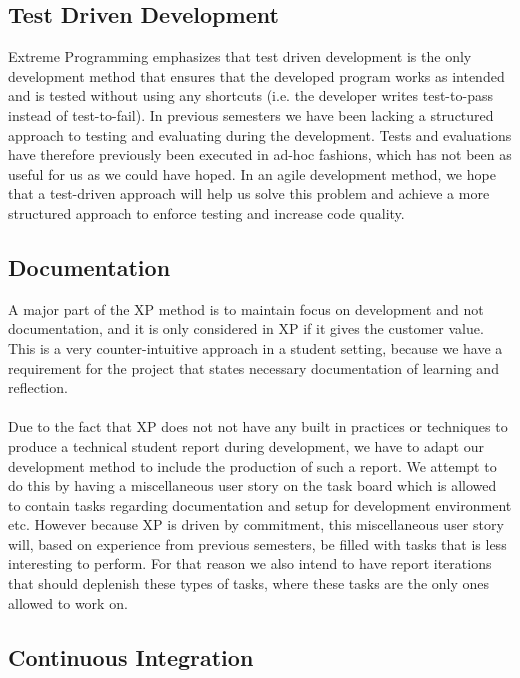 \subsection{Test Driven Development}
\label{sub:test_driven_development}
Extreme Programming emphasizes that test driven development is the only development method that ensures that the developed program works as intended and is tested without using any shortcuts (i.e. the developer writes test-to-pass instead of test-to-fail). In previous semesters we have been lacking a structured approach to testing and evaluating during the development. Tests and evaluations have therefore previously been executed in ad-hoc fashions, which has not been as useful for us as we could have hoped. In an agile development method, we hope that a test-driven approach will help us solve this problem and achieve a more structured approach to enforce testing and increase code quality.

\subsection{Documentation}
A major part of the XP method is to maintain focus on development and not documentation, and it is only considered in XP if it gives the customer value. This is a very counter-intuitive approach in a student setting, because we have a requirement for the project that states necessary documentation of learning and reflection. 
\\\\
Due to the fact that XP does not not have any built in practices or techniques to produce a technical student report during development, we have to adapt our development method to include the production of such a report. We attempt to do this by having a miscellaneous user story on the task board which is allowed to contain tasks regarding documentation and setup for development environment etc. However because XP is driven by commitment, this miscellaneous user story will, based on experience from previous semesters, be filled with tasks that is less interesting to perform. For that reason we also intend to have report iterations that should deplenish these types of tasks, where these tasks are the only ones allowed to work on.

\subsection{Continuous Integration}
\label{sub:continuous_integration}

